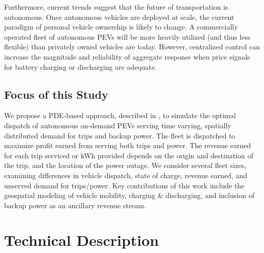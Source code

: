 \documentclass[journal]{IEEEtran}
\begin{document}
Furthermore, current trends suggest that the future of transportation is autonomous. Once autonomous vehicles are deployed at scale, the current paradigm of personal vehicle ownership is likely to change. A commercially operated fleet of autonomous PEVs will be more heavily utilized (and thus less flexible) than privately owned vehicles are today. However, centralized control can increase the magnitude and reliability of aggregate response when price signals for battery charging or discharging are adequate. 

\subsection{Focus of this Study}

We propose a PDE-based approach, described in \cite{lefloch_pde_2016}, to simulate the optimal dispatch of autonomous on-demand PEVs serving time varying, spatially distributed demand for trips and backup power. The fleet is dispatched to maximize profit earned from serving both trips and power. The revenue earned for each trip serviced or kWh provided depends on the origin and destination of the trip, and the location of the power outage. We consider several fleet sizes, examining differences in vehicle dispatch, state of charge, revenue earned, and unserved demand for trips/power. Key contributions of this work include the geospatial modeling of vehicle mobility, charging \& discharging, and inclusion of backup power as an ancillary revenue stream.

\section{Technical Description}
\end{document}
